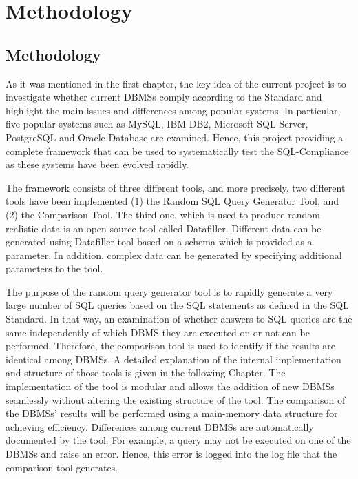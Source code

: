 \chapter{Methodology}

\section{Methodology}
 
As it was mentioned in the first chapter, the key idea of the current project is to investigate whether current DBMSs comply according to the Standard and highlight the main issues and differences among popular systems. In particular, five popular systems such as MySQL, IBM DB2, Microsoft SQL Server, PostgreSQL and Oracle Database are examined. Hence, this project providing a complete framework that can be used to systematically test the SQL-Compliance as these systems have been evolved rapidly.
 
The framework consists of three different tools, and more precisely, two different tools have been implemented (1) the Random SQL Query Generator Tool, and (2) the Comparison Tool. The third one, which is used to produce random realistic data is an open-source tool called Datafiller. Different data can be generated using Datafiller tool based on a schema which is provided as a parameter. In addition, complex data can be generated by specifying additional parameters to the tool.  
 
The purpose of the random query generator tool is to rapidly generate a very large number of SQL queries based on the SQL statements as defined in the SQL Standard. In that way, an examination of whether answers to SQL queries are the same independently of which DBMS they are executed on or not can be performed. Therefore, the comparison tool is used to identify if the results are identical among DBMSs. A detailed explanation of the internal implementation and structure of those tools is given in the following Chapter. The implementation of the tool is modular and allows the addition of new DBMSs seamlessly without altering the existing structure of the tool. The comparison of the DBMSs’ results will be performed using a main-memory data structure for achieving efficiency. Differences among current DBMSs are automatically documented by the tool. For example, a query may not be executed on one of the DBMSs and raise an error. Hence, this error is logged into the log file that the comparison tool generates.  








 